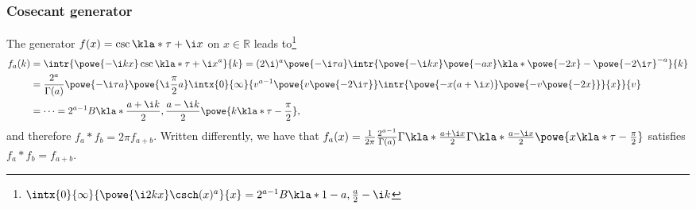 \documentclass[english, parskip=full]{scrartcl}
\begin{document}
\subsubsection{Cosecant generator}
The generator $f(x) = \csc\kla*{\tau + \i x}$ on $x\in\mathbb{R}$ leads to\footnote{$\intx{0}{\infty}{\powe{\i 2kx} \csch(x)^a}{x} = 2^{a-1} B\kla*{1-a, \frac{a}{2} - \i k}$}
\begin{align}%
f_a(k) &= \intr{\powe{-\i kx} \csc\kla*{\tau + \i x}^a}{k} = (2\i)^a \powe{-\i\tau a} \intr{\powe{-\i kx} \powe{-ax} \kla*{\powe{-2x} - \powe{-2\i\tau}}^{-a}}{k}\\
&= \frac{2^a}{\Gamma(a)} \powe{-\i\tau a} \powe{\i \frac{\pi}{2}a}\intx{0}{\infty}{v^{a-1} \powe{v\powe{-2\i\tau}} \intr{\powe{-x(a+\i x)} \powe{-v \powe{-2x}}}{x}}{v}\\
&= \dots = 2^{a-1} B\kla*{\frac{a+\i k}{2}, \frac{a-\i k}{2}} \powe{k\kla*{\tau - \frac{\pi}{2}}},
\end{align}
and therefore $f_a\ast f_b = 2\pi f_{a+b}$.
Written differently, we have that $f_a(x) = \frac{1}{2\pi} \frac{2^{a-1}}{\Gamma(a)} \Gamma\kla*{\frac{a+\i x}{2}} \Gamma\kla*{\frac{a-\i x}{2}} \powe{x\kla*{\tau - \frac{\pi}{2}}}$ satisfies $f_a\ast f_b = f_{a+b}$.


\end{document}
